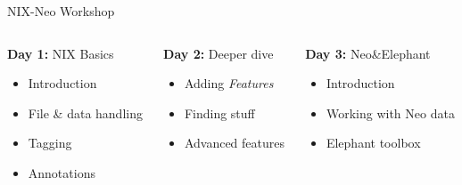 \documentclass[pdftex]{beamer}
\begin{document}
\begin{frame}{NIX-Neo Workshop}
    \begin{columns}[t]
        \begin{column}{4cm}
            \textbf{Day 1:} NIX Basics\vspace{1ex}
            \begin{itemize}
                \item Introduction
                \item File \& data handling
                \item Tagging
                \item Annotations
            \end{itemize}
        \end{column}
        \begin{column}{4cm}
            \textbf{Day 2:} Deeper dive\vspace{1ex}
            \begin{itemize}
                \item Adding \textit{Features}
                \item Finding stuff
                \item Advanced features
            \end{itemize}
        \end{column}
        \begin{column}{4cm}
            \textbf{Day 3:} Neo\&Elephant\vspace{1ex}
            \begin{itemize}
                \item Introduction
                \item Working with Neo data
                \item Elephant toolbox
            \end{itemize}
        \end{column}
    \end{columns}
\end{frame}
\end{document}
